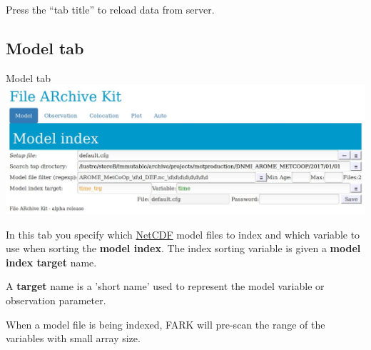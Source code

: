 \documentclass[letterpaper,10pt,twoside,twocolumn,openany]{book}
\begin{document}
\begin{quotebox}
Press the ``tab title'' to reload data from server.
\end{quotebox}

\subsection{Model tab}

\begin{paperbox}{Model tab}
  \includegraphics[width=\columnwidth]{fark_model.jpg}
\end{paperbox}
In this tab you specify which \hyperlink{netcdf}{NetCDF} model files to index and which variable to use when sorting the  {\bf model index}.
The index sorting variable is given a {\bf model index target} name.

\begin{quotebox}
  A {\bf target} name is a 'short name' used to
  represent the model variable or observation 
  parameter.
\end{quotebox}
When a model file is being indexed, FARK will pre-scan the range of the variables with small array size.
\end{document}
